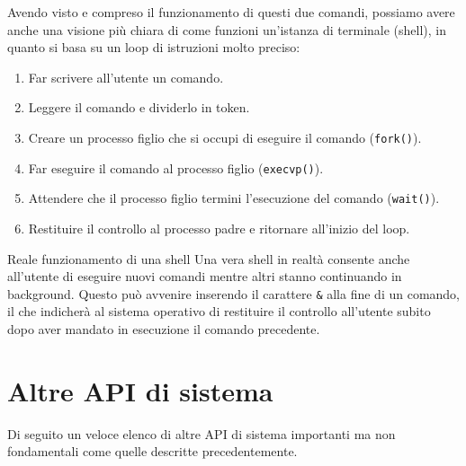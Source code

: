 \documentclass[12pt]{report}
\begin{document}
	Avendo visto e compreso il funzionamento di questi due comandi, possiamo avere anche una visione più chiara di come funzioni un'istanza di terminale (shell), in quanto si basa su un loop di istruzioni molto preciso:
	\begin{enumerate}
		\item Far scrivere all'utente un comando. 
		
		\item Leggere il comando e dividerlo in token.
		
		\item Creare un processo figlio che si occupi di eseguire il comando (\texttt{fork()}).
		
		\item Far eseguire il comando al processo figlio (\texttt{execvp()}).
		
		\item Attendere che il processo figlio termini l'esecuzione del comando (\texttt{wait()}).
		
		\item Restituire il controllo al processo padre e ritornare all'inizio del loop.
	\end{enumerate}
	\begin{osservazione}{Reale funzionamento di una shell}{}
		Una vera shell in realtà consente anche all'utente di eseguire nuovi comandi mentre altri stanno continuando in background. Questo può avvenire inserendo il carattere \texttt{\&} alla fine di un comando, il che indicherà al sistema operativo di restituire il controllo all'utente subito dopo aver mandato in esecuzione il comando precedente.
	\end{osservazione}
	
	\section{Altre API di sistema}
	Di seguito un veloce elenco di altre API di sistema importanti ma non fondamentali come quelle descritte precedentemente.
	
\end{document}

